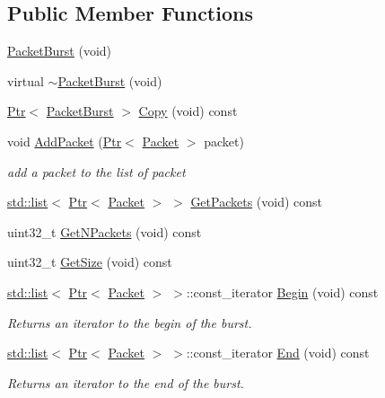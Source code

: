\subsection*{Public Member Functions}
\begin{DoxyCompactItemize}
\item 
\hyperlink{classns3_1_1PacketBurst_aadf7bb4a51746449e83cf1c79b22f44b}{Packet\+Burst} (void)
\item 
virtual \hyperlink{classns3_1_1PacketBurst_a4f696898ce30f32e5a87fb4b2275407c}{$\sim$\+Packet\+Burst} (void)
\item 
\hyperlink{classns3_1_1Ptr}{Ptr}$<$ \hyperlink{classns3_1_1PacketBurst}{Packet\+Burst} $>$ \hyperlink{classns3_1_1PacketBurst_a68d53d47afa08a8841d97e40d5d71e10}{Copy} (void) const 
\item 
void \hyperlink{classns3_1_1PacketBurst_ade6b7d6cf5968f2a19ac70e416c7237f}{Add\+Packet} (\hyperlink{classns3_1_1Ptr}{Ptr}$<$ \hyperlink{classns3_1_1Packet}{Packet} $>$ packet)
\begin{DoxyCompactList}\small\item\em add a packet to the list of packet \end{DoxyCompactList}\item 
\hyperlink{openflow-interface_8h_afd9bcfa176617760671b67580f536fa7}{std\+::list}$<$ \hyperlink{classns3_1_1Ptr}{Ptr}$<$ \hyperlink{classns3_1_1Packet}{Packet} $>$ $>$ \hyperlink{classns3_1_1PacketBurst_a9e3a850b05000927dc7cce8194b3986a}{Get\+Packets} (void) const 
\item 
uint32\+\_\+t \hyperlink{classns3_1_1PacketBurst_ad519fc038ccdb8b5d8e58030c09fc48a}{Get\+N\+Packets} (void) const 
\item 
uint32\+\_\+t \hyperlink{classns3_1_1PacketBurst_a15ff424c56f3cde5beaa10802a9ff653}{Get\+Size} (void) const 
\item 
\hyperlink{openflow-interface_8h_afd9bcfa176617760671b67580f536fa7}{std\+::list}$<$ \hyperlink{classns3_1_1Ptr}{Ptr}$<$ \hyperlink{classns3_1_1Packet}{Packet} $>$ $>$\+::const\+\_\+iterator \hyperlink{classns3_1_1PacketBurst_aad62123252fc5c91cdc30eb85bf1a48d}{Begin} (void) const 
\begin{DoxyCompactList}\small\item\em Returns an iterator to the begin of the burst. \end{DoxyCompactList}\item 
\hyperlink{openflow-interface_8h_afd9bcfa176617760671b67580f536fa7}{std\+::list}$<$ \hyperlink{classns3_1_1Ptr}{Ptr}$<$ \hyperlink{classns3_1_1Packet}{Packet} $>$ $>$\+::const\+\_\+iterator \hyperlink{classns3_1_1PacketBurst_ac907496f3faf343051f0f9c490829381}{End} (void) const 
\begin{DoxyCompactList}\small\item\em Returns an iterator to the end of the burst. \end{DoxyCompactList}\end{DoxyCompactItemize}
